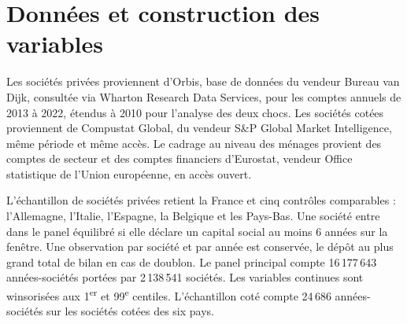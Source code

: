 \section{Données et construction des variables}\label{sec:donnees}

Les sociétés privées proviennent d'Orbis, base de données du vendeur Bureau van Dijk, consultée via
Wharton Research Data Services, pour les comptes annuels de 2013 à 2022, étendus à 2010 pour
l'analyse des deux chocs. Les sociétés cotées proviennent de Compustat Global, du vendeur
S\&P Global Market Intelligence, même période et même accès. Le cadrage au niveau des ménages
provient des comptes de secteur et des comptes financiers d'Eurostat, vendeur Office statistique de
l'Union européenne, en accès ouvert.

L'échantillon de sociétés privées retient la France et cinq contrôles comparables : l'Allemagne,
l'Italie, l'Espagne, la Belgique et les Pays-Bas. Une société entre dans le panel équilibré si elle
déclare un capital social au moins 6 années sur la fenêtre. Une observation par société et par année
est conservée, le dépôt au plus grand total de bilan en cas de doublon. Le panel principal compte
16\,177\,643 années-sociétés portées par 2\,138\,541 sociétés. Les variables continues sont
winsorisées aux 1\textsuperscript{er} et 99\textsuperscript{e} centiles. L'échantillon coté compte
24\,686 années-sociétés sur les sociétés cotées des six pays.

